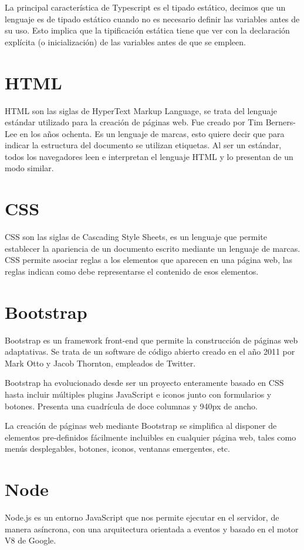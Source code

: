 \documentclass[a4paper, 12pt]{book}
\begin{document}
	La principal característica de Typescript es el tipado estático, decimos que un lenguaje es de tipado estático cuando no es necesario definir las variables antes de su uso. Esto implica que la tipificación estática tiene que ver con la declaración explícita (o inicialización) de las variables antes de que se empleen.


\section{HTML}
\label{sec:HTML}
HTML son las siglas de HyperText Markup Language, se trata del lenguaje estándar utilizado para la creación de páginas web. Fue creado por Tim Berners-Lee en los años ochenta. Es un lenguaje de marcas, esto quiere decir que para indicar la estructura del documento se utilizan etiquetas. Al ser un estándar, todos los navegadores leen e interpretan el lenguaje HTML y lo presentan de un modo similar.

\section{CSS}
\label{sec:CSS}
CSS son las siglas de Cascading Style Sheets, es un lenguaje que permite establecer la apariencia de un documento escrito mediante un lenguaje de marcas. CSS permite asociar reglas a los elementos que aparecen en una página web, las reglas indican como debe representarse el contenido de esos elementos.

\section{Bootstrap}
\label{sec:Bootstrap}
Bootstrap es un framework front-end que permite la construcción de páginas web adaptativas. Se trata de un software de código abierto creado en el año 2011 por Mark Otto y Jacob Thornton, empleados de Twitter.

	Bootstrap ha evolucionado desde ser un proyecto enteramente basado en CSS hasta incluir múltiples plugins JavaScript e iconos junto con formularios y botones. Presenta una cuadrícula de doce columnas y 940px de ancho.

	La creación de páginas web mediante Bootstrap se simplifica al disponer de elementos pre-definidos fácilmente incluibles en cualquier página web, tales como menús desplegables, botones, iconos, ventanas emergentes, etc.

\section{Node} 
\label{sec:Node}
	Node.js es un entorno JavaScript que nos permite ejecutar en el servidor, de manera asíncrona, con una arquitectura orientada a eventos y basado en el motor V8 de Google.
	
\end{document}
